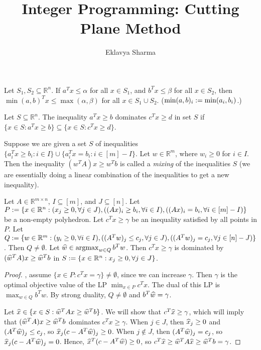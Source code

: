 \documentclass[a4paper,12pt,fleqn]{article}
\author{Eklavya Sharma}
\date{\empty}
\title{Integer Programming: Cutting Plane Method}
\begin{document}
\maketitle
\setlength{\parskip}{0.2em}

\begin{lemma}[Disjunction]
Let $S_1, S_2 \subseteq \mathbb{R}^n$.
If $a^Tx \le \alpha$ for all $x \in S_1$,
and $b^Tx \le \beta$ for all $x \in S_2$,
then $\min(a, b)^Tx \le \max(\alpha, \beta)$ for all $x \in S_1 \cup S_2$.
($\min(a, b)_i := \min(a_i, b_i)$.)
\end{lemma}

\begin{definition}
Let $S \subseteq \mathbb{R}^n$.
The inequality $a^Tx \ge b$ dominates $c^Tx \ge d$ in set $S$ if
$\{x \in S: a^Tx \ge b\} \subseteq \{x \in S: c^Tx \ge d\}$.
\end{definition}

\begin{definition}[Mixing]
Suppose we are given a set $S$ of inequalities
$\{a_i^Tx \ge b_i: i \in I\} \cup \{a_i^Tx = b_i: i \in [m] - I\}$.
Let $w \in \mathbb{R}^m$, where $w_i \ge 0$ for $i \in I$.
Then the inequality $(w^TA)x \ge w^Tb$ is called a \emph{mixing} of the inequalities $S$
(we are essentially doing a linear combination of the inequalities to get a new inequality).
\end{definition}

\begin{theorem}
Let $A \in \mathbb{R}^{m \times n}$, $I \subseteq [m]$, and $J \subseteq [n]$. Let
\\ $P := \{x \in \mathbb{R}^n: (x_j \ge 0, \forall j \in J), ((Ax)_i \ge b_i, \forall i \in I),
((Ax)_i = b_i, \forall i \in [m]-I) \}$ be a non-empty polyhedron.
Let $c^Tx \ge \gamma$ be an inequality satisfied by all points in $P$. Let
\\ $Q := \{w \in \mathbb{R}^m: (y_i \ge 0, \forall i \in I), ((A^Tw)_j \le c_j, \forall j \in J),
((A^Tw)_j = c_j, \forall j \in [n]-J) \}$.
Then $Q \neq \emptyset$. Let $\widehat{w} \in \operatorname*{argmax}_{w \in Q} b^Tw$.
Then $c^Tx \ge \gamma$ is dominated by $(\widehat{w}^TA)x \ge \widehat{w}^Tb$
in $S := \{x \in \mathbb{R}^n: x_j \ge 0, \forall j \in J\}$.
\end{theorem}
\begin{proof}
\WLoG, assume $\{x \in P: c^Tx = \gamma\} \neq \emptyset$, since we can increase $\gamma$.
Then $\gamma$ is the optimal objective value of the LP $\min_{x \in P} c^Tx$.
The dual of this LP is $\max_{w \in Q} b^Tw$.
By strong duality, $Q \neq \emptyset$ and $b^T\widehat{w} = \gamma$.

Let $\widehat{x} \in \{x \in S: \widehat{w}^TAx \ge \widehat{w}^Tb\}$. We will show that $c^T\widehat{x} \ge \gamma$,
which will imply that $(\widehat{w}^TA)x \ge \widehat{w}^Tb$ dominates $c^Tx \ge \gamma$.
When $j \in J$, then $\widehat{x}_j \ge 0$ and $(A^T\widehat{w})_j \le c_j$, so $\widehat{x}_j(c - A^T\widehat{w})_j \ge 0$.
When $j \not\in J$, then $(A^T\widehat{w})_j = c_j$, so $\widehat{x}_j(c - A^T\widehat{w})_j = 0$.
Hence, $\widehat{x}^T(c - A^T\widehat{w}) \ge 0$, so $c^T\widehat{x} \ge \widehat{w}^TA\widehat{x} \ge \widehat{w}^Tb = \gamma$.
\end{proof}
\end{document}
